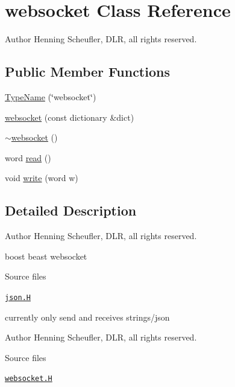 \hypertarget{classFoam_1_1websocket}{}\section{websocket Class Reference}
\label{classFoam_1_1websocket}


Author Henning Scheufler, D\+LR, all rights reserved.  


\subsection*{Public Member Functions}
\begin{DoxyCompactItemize}
\item 
\hyperlink{classFoam_1_1websocket_a29e24ced6840a64969bd5ba83687b121}{Type\+Name} (\char`\"{}websocket\char`\"{})
\item 
\hyperlink{classFoam_1_1websocket_a300c1219f3357ba1acd65bdd2dbd792c}{websocket} (const dictionary \&dict)
\item 
\hyperlink{classFoam_1_1websocket_a0307b233f5ff01457053379be1168f43}{$\sim$websocket} ()
\item 
word \hyperlink{classFoam_1_1websocket_aaef38f7ec08b1ae0135900e9ae1fb1f8}{read} ()
\item 
void \hyperlink{classFoam_1_1websocket_a5abf104fabb38aa7c80721483091cf0b}{write} (word w)
\end{DoxyCompactItemize}


\subsection{Detailed Description}
Author Henning Scheufler, D\+LR, all rights reserved. 

boost beast websocket

\label{_Description}%
 \begin{DoxyParagraph}{Source files}

\begin{DoxyItemize}
\item \href{../../../home/carlo/data/GeN-Foam/GeN-Foam_ffn/GeN-Foam/GeN-Foam/FMU4FOAM/ECI4FOAM/src/externalComm/networkInterface/json.H}{\tt json.\+H} 
\end{DoxyItemize}
\end{DoxyParagraph}
\label{_Description}%
 currently only send and receives strings/json

Author Henning Scheufler, D\+LR, all rights reserved.

\begin{DoxyParagraph}{Source files}

\begin{DoxyItemize}
\item \href{../../../home/carlo/data/GeN-Foam/GeN-Foam_ffn/GeN-Foam/GeN-Foam/FMU4FOAM/ECI4FOAM/src/externalComm/networkInterface/websocket.H}{\tt websocket.\+H} 
\end{DoxyItemize}
\end{DoxyParagraph}


